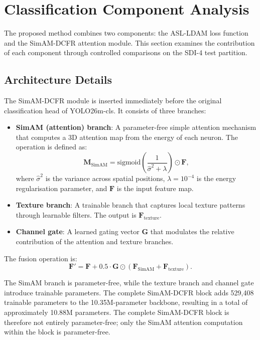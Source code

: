 
\section{Classification Component Analysis}
\label{sec:component-analysis}

The proposed method combines two components: the ASL-LDAM loss function and the SimAM-DCFR attention module. This section examines the contribution of each component through controlled comparisons on the SDI-4 test partition.

\subsection{Architecture Details}
\label{sec:simam-dcfr-architecture}

The SimAM-DCFR module is inserted immediately before the original classification head of YOLO26m-cls. It consists of three branches:

\begin{itemize}
    \item \textbf{SimAM (attention) branch}: A parameter-free simple attention mechanism that computes a 3D attention map from the energy of each neuron. The operation is defined as:
    \[
    \mathbf{M}_{\text{SimAM}} = \text{sigmoid}\left(\frac{1}{\hat{\sigma}^2 + \lambda}\right) \odot \mathbf{F},
    \]
    where $\hat{\sigma}^2$ is the variance across spatial positions, $\lambda = 10^{-4}$ is the energy regularisation parameter, and $\mathbf{F}$ is the input feature map.
    \item \textbf{Texture branch}: A trainable branch that captures local texture patterns through learnable filters. The output is $\mathbf{F}_{\text{texture}}$.
    \item \textbf{Channel gate}: A learned gating vector $\mathbf{G}$ that modulates the relative contribution of the attention and texture branches.
\end{itemize}

The fusion operation is:
\[
\mathbf{F}' = \mathbf{F} + 0.5 \cdot \mathbf{G} \odot (\mathbf{F}_{\text{SimAM}} + \mathbf{F}_{\text{texture}}).
\]

The SimAM branch is parameter-free, while the texture branch and channel gate introduce trainable parameters. The complete SimAM-DCFR block adds 529,408 trainable parameters to the 10.35M-parameter backbone, resulting in a total of approximately 10.88M parameters. The complete SimAM-DCFR block is therefore not entirely parameter-free; only the SimAM attention computation within the block is parameter-free.

